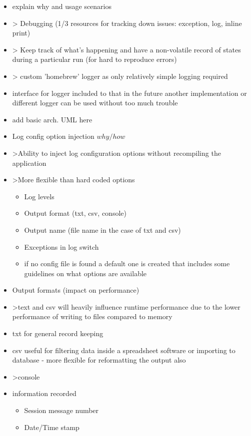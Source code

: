 \begin{itemize}
    \item explain why and usage scenarios
    \item > Debugging (1/3 resources for tracking down issues: exception, log, inline print)
    \item > Keep track of what's happening and have a non-volatile record of states during a particular run (for hard to reproduce errors)
    \item > custom 'homebrew' logger as only relatively simple logging required
    \item interface for logger included to that in the future another implementation or different logger can be used without too much trouble
    \item add basic arch. UML here
    \item Log config option injection \(why/how\)
    \item >Ability to inject log configuration options without recompiling the application
    \item >More flexible than hard coded options
    \begin{itemize}
    	\item Log levels
    	\item Output format (txt, csv, console)
    	\item Output name (file name in the case of txt and csv)
    	\item Exceptions in log switch
    	\item if no config file is found a default one is created that includes some guidelines on what options are available
    \end{itemize}
    \item Output formats (impact on performance)
    \item >text and csv will heavily influence runtime performance due to the lower performance of writing to files compared to memory
    \item txt for general record keeping
    \item csv useful for filtering data inside a spreadsheet software or importing to database - more flexible for reformatting the output also
    \item >console
    \item information recorded
    \begin{itemize}
    	\item Session message number
    	\item Date/Time stamp

\end{itemize}
\end{itemize}
